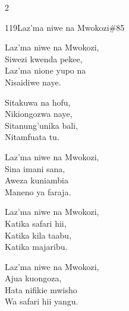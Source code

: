 \documentclass{article}
\begin{document}
\begin{multicols}{2}
\begin{hymn}{119}{Laz'ma niwe na Mwokozi}{\#85}
\begin{stanza}
Laz'ma niwe na Mwokozi,\\
Siwezi kwenda pekee,\\
Laz'ma nione yupo na\\
Nisaidiwe naye.
\end{stanza}
\begin{chorus}
Sitakuwa na hofu,\\
Nikiongozwa naye,\\
Sitanung'unika bali,\\
Nitamfuata tu.
\end{chorus}
\begin{stanza}
Laz'ma niwe na Mwokozi,\\
Sina imani sana,\\
Aweza kuniambia\\
Maneno ya faraja.
\end{stanza}
\begin{stanza}
Laz'ma niwe na Mwokozi,\\
Katika safari hii,\\
Katika kila taabu,\\
Katika majaribu.
\end{stanza}
\begin{stanza}
Laz'ma niwe na Mwokozi,\\
Ajua kuongoza,\\
Hata nifikie mwisho\\
Wa safari hii yangu.
\end{stanza}
\end{hymn}


\end{multicols}
\end{document}

